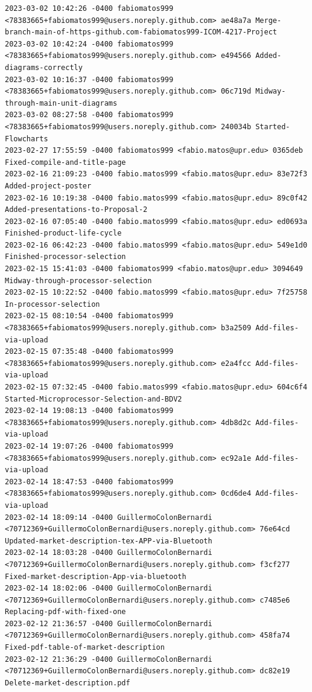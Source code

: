 \documentclass[12pt]{article}
\begin{document}
\begin{lstlisting}
2023-03-02 10:42:26 -0400 fabiomatos999 <78383665+fabiomatos999@users.noreply.github.com> ae48a7a Merge-branch-main-of-https-github.com-fabiomatos999-ICOM-4217-Project
2023-03-02 10:42:24 -0400 fabiomatos999 <78383665+fabiomatos999@users.noreply.github.com> e494566 Added-diagrams-correctly
2023-03-02 10:16:37 -0400 fabiomatos999 <78383665+fabiomatos999@users.noreply.github.com> 06c719d Midway-through-main-unit-diagrams
2023-03-02 08:27:58 -0400 fabiomatos999 <78383665+fabiomatos999@users.noreply.github.com> 240034b Started-Flowcharts
2023-02-27 17:55:59 -0400 fabiomatos999 <fabio.matos@upr.edu> 0365deb Fixed-compile-and-title-page
2023-02-16 21:09:23 -0400 fabio.matos999 <fabio.matos@upr.edu> 83e72f3 Added-project-poster
2023-02-16 10:19:38 -0400 fabio.matos999 <fabio.matos@upr.edu> 89c0f42 Added-presentations-to-Proposal-2
2023-02-16 07:05:40 -0400 fabio.matos999 <fabio.matos@upr.edu> ed0693a Finished-product-life-cycle
2023-02-16 06:42:23 -0400 fabio.matos999 <fabio.matos@upr.edu> 549e1d0 Finished-processor-selection
2023-02-15 15:41:03 -0400 fabiomatos999 <fabio.matos@upr.edu> 3094649 Midway-through-processor-selection
2023-02-15 10:22:52 -0400 fabio.matos999 <fabio.matos@upr.edu> 7f25758 In-processor-selection
2023-02-15 08:10:54 -0400 fabiomatos999 <78383665+fabiomatos999@users.noreply.github.com> b3a2509 Add-files-via-upload
2023-02-15 07:35:48 -0400 fabiomatos999 <78383665+fabiomatos999@users.noreply.github.com> e2a4fcc Add-files-via-upload
2023-02-15 07:32:45 -0400 fabio.matos999 <fabio.matos@upr.edu> 604c6f4 Started-Microprocessor-Selection-and-BDV2
2023-02-14 19:08:13 -0400 fabiomatos999 <78383665+fabiomatos999@users.noreply.github.com> 4db8d2c Add-files-via-upload
2023-02-14 19:07:26 -0400 fabiomatos999 <78383665+fabiomatos999@users.noreply.github.com> ec92a1e Add-files-via-upload
2023-02-14 18:47:53 -0400 fabiomatos999 <78383665+fabiomatos999@users.noreply.github.com> 0cd6de4 Add-files-via-upload
2023-02-14 18:09:14 -0400 GuillermoColonBernardi <70712369+GuillermoColonBernardi@users.noreply.github.com> 76e64cd Updated-market-description-tex-APP-via-Bluetooth
2023-02-14 18:03:28 -0400 GuillermoColonBernardi <70712369+GuillermoColonBernardi@users.noreply.github.com> f3cf277 Fixed-market-description-App-via-bluetooth
2023-02-14 18:02:06 -0400 GuillermoColonBernardi <70712369+GuillermoColonBernardi@users.noreply.github.com> c7485e6 Replacing-pdf-with-fixed-one
2023-02-12 21:36:57 -0400 GuillermoColonBernardi <70712369+GuillermoColonBernardi@users.noreply.github.com> 458fa74 Fixed-pdf-table-of-market-description
2023-02-12 21:36:29 -0400 GuillermoColonBernardi <70712369+GuillermoColonBernardi@users.noreply.github.com> dc82e19 Delete-market-description.pdf

\end{lstlisting}
\end{document}
